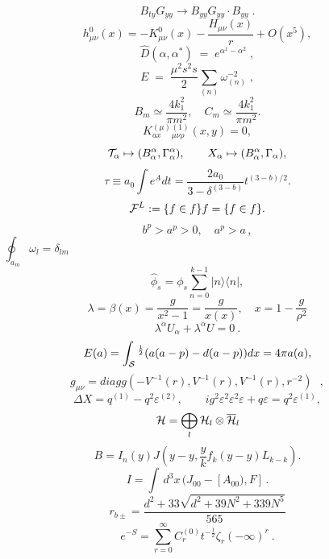 \documentclass{article}
\begin{document}
$$B _ { t y } G _ { y y } \rightarrow B _ { y y } G _ { y y } \cdot B _ { y y } \; .$$
$$h _ { \mu \nu } ^ { 0 } ( x ) = - K _ { \mu \nu } ^ { 0 } ( x ) - \frac { H _ { \mu \nu } ( x ) } { r } + O ( x ^ { 5 } ) ,$$
$$\hat { D } ( \alpha , \alpha ^ { * } ) \; = \; e ^ { \alpha ^ { 1 } - \alpha ^ { 2 } } \; ,$$
$$E \; = \; \frac { \mu ^ { 2 } s ^ { 2 } s } { 2 } \sum _ { ( n ) } \omega _ { ( n ) } ^ { - 2 } \; ,$$
$$B _ { m } \simeq \frac { 4 k _ { 1 } ^ { 2 } } { \pi m ^ { 2 } } , \quad C _ { m } \simeq \frac { 4 k _ { 1 } ^ { 2 } } { \pi m ^ { 2 } } .$$
$$K _ { a x } ^ { ( \mu ) } { } _ { \mu \nu \rho } ^ { ( 1 ) } ( x , y ) = 0 ,$$
$${ \cal T } _ { \alpha } \mapsto ( B _ { \alpha } ^ { \alpha } , \Gamma _ { \alpha } ^ { \alpha } ) , \qquad X _ { \alpha } \mapsto ( B _ { \alpha } ^ { \alpha } , \Gamma _ { \alpha } ) ,$$
$$\tau \equiv a _ { 0 } \int e ^ { A } d t = \frac { 2 a _ { 0 } } { 3 - \delta ^ { ( 3 - b ) } } t ^ { ( 3 - b ) / 2 } .$$
$${ \cal F } ^ { L } : = \{ f \in f \} f = \{ f \in f \} .$$
$$b ^ { p } > a ^ { p } > 0 , \quad a ^ { p } > a \, ,$$
$$\oint _ { a _ { m } } \omega _ { l } = \delta _ { l m } ~ ~ ~ ~ ~ ~ ~ ~ ~ ~ ~ ~ ~ ~ ~ ~ ~ ~ ~ ~ ~ ~ ~ ~ ~ ~ ~ ~ ~ ~ ~ ~ ~ ~ ~ ~ ~ ~ ~ ~ ~ ~ ~ ~ ~ ~ ~ ~ ~ ~ ~ ~ ~ ~ ~ ~ ~ ~ ~ ~ ~ ~ ~ ~ ~ ~ ~ ~ ~ ~ ~ ~ ~ ~ ~ ~ ~ ~ ~ ~ ~ ~ ~ ~ ~ ~ ~ ~ ~ ~ ~ ~ ~ ~ ~ ~ ~ ~ ~ ~ ~ ~ ~ ~ ~ ~ ~ ~ ~ ~ ~ ~ ~ ~ ~ ~ ~ ~ ~ ~ ~ ~ ~ ~ ~ ~ ~ ~ ~$$
$$\hat { \phi } _ { s } = \phi _ { s } \sum _ { n = 0 } ^ { k - 1 } | n \rangle \langle n | ,$$
$$\lambda = \beta ( x ) = \frac { g } { x ^ { 2 } - 1 } = \frac { g } { x ( x ) } , \quad x = 1 - \frac { g } { \rho ^ { 2 } }$$
$$\lambda ^ { \alpha } U _ { \alpha } + \lambda ^ { \alpha } U = 0 \ .$$
$$E ( a ) = \int _ { { \cal { S } } } { } ^ { \frac { 1 } { 2 } } ( a ( a - p ) - d ( a - p ) ) d x = 4 \pi a ( a ) ,$$
$$g _ { \mu \nu } = d i a g g ( - V ^ { - 1 } ( r ) , V ^ { - 1 } ( r ) , V ^ { - 1 } ( r ) , r ^ { - 2 } ) ~ ~ ~ ,$$
$$\Delta X = q ^ { ( 1 ) } - q ^ { 2 } \varepsilon ^ { ( 2 ) } , \quad \quad i g ^ { 2 } \varepsilon ^ { 2 } \varepsilon ^ { 2 } \varepsilon + q \varepsilon = q ^ { 2 } \varepsilon ^ { ( 1 ) } ,$$
$${ \cal H } = \bigoplus _ { l } { \cal H } _ { l } \otimes \overline { { \cal H } } _ { l }$$
$$B = I _ { n } ( y ) J \left ( y - y , \frac { y } { k } f _ { k } ( y - y ) L _ { k - k } \right ) .$$
$$I = \int \, d ^ { 3 } x \, ( J _ { 0 0 } - [ A _ { 0 0 } ) , F ] \, .$$
$$r _ { b \pm } = \frac { d ^ { 2 } + 3 3 \sqrt { d ^ { 2 } + 3 9 N ^ { 2 } + 3 3 9 N ^ { 5 } } } { 5 6 5 }$$
$$e ^ { - S } = \sum _ { r = 0 } ^ { \infty } C _ { r } ^ { ( 0 ) } t ^ { - \frac { 1 } { 2 } } \zeta _ { r } ( - \infty ) ^ { r } ~ .$$
\end{document}
